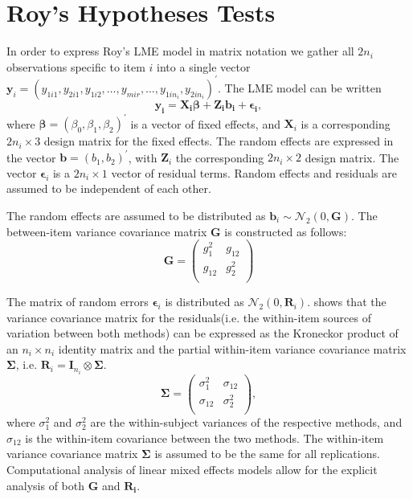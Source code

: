 \documentclass[Chap4main.tex]{subfiles}
\begin{document}
\newpage
\section{Roy's Hypotheses Tests}

In order to express Roy's LME model in matrix notation we gather all $2n_i$ observations specific to item $i$ into a single vector $\boldsymbol{y}_{i} = (y_{1i1},y_{2i1},y_{1i2},\ldots,y_{mir},\ldots,y_{1in_{i}},y_{2in_{i}})^\prime.$ The LME model can be written
\[
\boldsymbol{y_{i}} = \boldsymbol{X_{i}\beta} + \boldsymbol{Z_{i}b_{i}} + \boldsymbol{\epsilon_{i}},
\]
where $\boldsymbol{\beta}=(\beta_0,\beta_1,\beta_2)^\prime$ is a vector of fixed effects, and $\boldsymbol{X}_i$ is a corresponding $2n_i\times 3$ design matrix for the fixed effects. The random effects are expressed in the vector $\boldsymbol{b}=(b_1,b_2)^\prime$, with $\boldsymbol{Z}_i$ the corresponding $2n_i\times 2$ design matrix. The vector $\boldsymbol{\epsilon}_i$ is a $2n_i\times 1$ vector of residual terms. Random effects and residuals are assumed to be independent of each other.

The random effects are assumed to be distributed as $\boldsymbol{b}_i \sim \mathcal{N}_2(0,\boldsymbol{G})$. The between-item variance covariance matrix $\boldsymbol{G}$ is constructed as follows:
\[ \boldsymbol{G} =\left(
            \begin{array}{cc}
              g^2_1  & g_{12} \\
              g_{12} & g^2_2 \\
            \end{array}
          \right) \]

The matrix of random errors $\boldsymbol{\epsilon}_i$ is distributed as $\mathcal{N}_2(0,\boldsymbol{R}_i)$.
\citet{hamlett} shows that the variance covariance matrix for the residuals(i.e. the within-item sources of variation between both methods) can be expressed as the Kroneckor product of an $n_i \times n_i$ identity matrix and the partial within-item variance covariance matrix $\boldsymbol{\Sigma}$, i.e. $\boldsymbol{R}_{i} = \boldsymbol{I}_{n_{i}} \otimes \boldsymbol{\Sigma}$.
\[
\boldsymbol{\Sigma} = \left( \begin{array}{cc}
  \sigma^2_{1} & \sigma_{12} \\
  \sigma_{12} & \sigma^2_{2} \\
\end{array}\right),
\]
where $\sigma^2_{1}$ and $\sigma^2_{2}$ are the within-subject variances of the respective methods, and $\sigma_{12}$ is the within-item covariance between the two methods. The within-item variance covariance matrix $\boldsymbol{\Sigma}$ is assumed to be the same for all replications. Computational analysis of linear mixed effects models allow for the explicit analysis of both $\boldsymbol{G}$ and $\boldsymbol{R_i}$.
\end{document}
